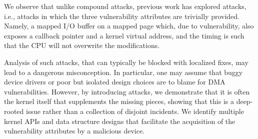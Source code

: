 We observe that unlike compound attacks, previous work has explored \simple{} attacks, i.e., attacks in which the three vulnerability attributes are trivially provided.
Namely, a mapped I/O buffer \DIFdelbegin {}\DIFdelend \DIFaddbegin {}\DIFaddend on a mapped page which, due to \subpage{} vulnerability, also exposes a callback pointer and a kernel virtual address, and the timing is such that the CPU will not overwrite the modifications.

Analysis of such \simple{} attacks, that can typically be blocked with localized fixes, may lead to a dangerous misconception. In particular, one may assume that buggy device drivers or poor but isolated design choices are to blame for DMA vulnerabilities\DIFaddbegin \DIFadd{~}\DIFaddend \cite{malka2015efficient,malka2015riommu}.
However, by introducing \compound attacks, we demonstrate that it is often the kernel itself that supplements the missing pieces, showing that this is a deep-rooted issue rather than a collection of disjoint incidents.
We identify multiple kernel APIs and data structure designs that facilitate the acquisition of the vulnerability attributes by a malicious device.


